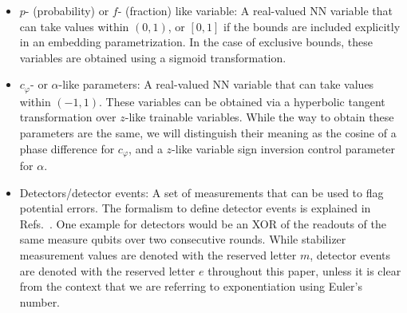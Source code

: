 \begin{itemize}
\item $p$- (probability) or $f$- (fraction) like variable: A real-valued NN variable that can take values within $(0, 1)$, or $[0,1]$ if the bounds are included explicitly in an embedding parametrization. In the case of exclusive bounds, these variables are obtained using a sigmoid transformation.
\item $c_\varphi$- or $\alpha$-like parameters: A real-valued NN variable that can take values within $(-1, 1)$. These variables can be obtained via a hyperbolic tangent transformation over $z$-like trainable variables. While the way to obtain these parameters are the same, we will distinguish their meaning as the cosine of a phase difference for $c_\varphi$, and a $z$-like variable sign inversion control parameter for $\alpha$.
\item Detectors/detector events: A set of measurements that can be used to flag potential errors. The formalism to define detector events is explained in Refs.~\cite{Gidney:2021,Higgott:2023,Bausch:2023jgi}. One example for detectors would be an XOR of the readouts of the same measure qubits over two consecutive rounds. While stabilizer measurement values are denoted with the reserved letter $m$, detector events are denoted with the reserved letter $e$ throughout this paper, unless it is clear from the context that we are referring to exponentiation using Euler's number.
\end{itemize}
